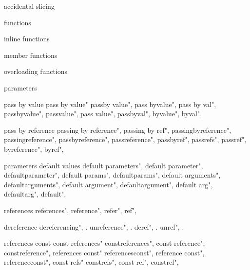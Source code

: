          accidental slicing 
        
         functions
        
         inline functions
        
         member functions

        overloading functions
        
         parameters
        
         pass by value
        pass by value"
        passby value",
        pass byvalue",
        pass by val",
        passbyvalue",
        passvalue",
        pass value",
        passbyval",
        byvalue",
        byval",
        
         pass by reference
        passing by reference",  
        passing by ref",  
        passingbyreference",  
        passingreference",  
        passbyreference",  
        passreference",  
        passbyref",  
        passrefs",  
        passref",  
        byreference", 
        byref", 

         parameters default values 
        default parameters",  
        default parameter",  
        defaultparameter",  
        default params",  
        defaultparams",  
        default arguments",  
        defaultarguments",  
        default argument",  
        defaultargument",  
        default arg",  
        defaultarg",  
        default",  
        
         references 
        references",  
        reference",  
        refer",  
        ref",  
        
         dereference 
        dereferencing", . 
        unreference", . 
        deref", . 
        unref", . 
        
         references const 
        const references"
        constreferences",
        const reference",
        constreference", 
        references const"
        referencesconst",
        reference const",
        referenceconst", 
        const refs"
        constrefs",
        const ref",
        constref", 
        
